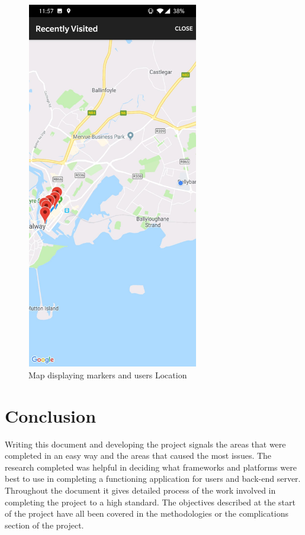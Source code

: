 \begin{figure}[ht!]
    \centering
 \includegraphics[width=75mm,height=162mm]{img/map_currrentLocation.jpg}
\caption{Map displaying markers and users Location}
\label{fig:Map displaying markers and location of user}
\end{figure}


\chapter{Conclusion}
Writing this document and developing the project signals the areas that were completed in an easy way and the areas that caused the most issues. The research completed was helpful in deciding what frameworks and platforms were best to use in completing a functioning application for users and back-end server. Throughout the document it gives detailed process of the work involved in completing the project to a high standard. The objectives described at the start of the project have all been covered in the methodologies or the complications section of the project. 
